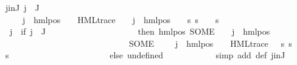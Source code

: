 \begin{isabellebody}
\ j{\isacharunderscore}{\kern0pt}in{\isacharunderscore}{\kern0pt}J{\isacharcolon}{\kern0pt}\ {\isachardoublequoteopen}j\ {\isasymin}\ J{\isachardoublequoteclose}\isanewline
\ \ \ \ \ \ \ \ \isamarkupfalse%
\ \isamarkupfalse%
\ {\isachardoublequoteopen}{\isasymexists}{\isasymalpha}\ {\isasympsi}\ {\isasymphi}{\isachardot}{\kern0pt}\ {\isasymPsi}\ j\ {\isacharequal}{\kern0pt}\ hml{\isacharunderscore}{\kern0pt}pos\ {\isasymalpha}\ {\isasympsi}\ {\isasymand}\ HML{\isacharunderscore}{\kern0pt}trace\ {\isasympsi}\ {\isasymand}\ {\isasymPhi}\ j\ {\isacharequal}{\kern0pt}\ hml{\isacharunderscore}{\kern0pt}pos\ {\isasymalpha}\ {\isasymphi}\ {\isasymand}\ {\isacharparenleft}{\kern0pt}{\isasymforall}s{\isachardot}{\kern0pt}\ {\isacharparenleft}{\kern0pt}s\ {\isasymTurnstile}\ {\isasymphi}{\isacharparenright}{\kern0pt}\ {\isacharequal}{\kern0pt}\ {\isacharparenleft}{\kern0pt}s\ {\isasymTurnstile}\ {\isasympsi}{\isacharparenright}{\kern0pt}{\isacharparenright}{\kern0pt}{\isachardoublequoteclose}\isanewline
\ \ \ \ \ \ \ \ \isamarkupfalse%
{\isacharminus}{\kern0pt}\isanewline
\ \ \ \ \ \ \ \ \isamarkupfalse%
\ {\isachardoublequoteopen}{\isasymPsi}\ j\ {\isacharequal}{\kern0pt}\ {\isacharparenleft}{\kern0pt}if\ j\ {\isasymin}\ J\ \isanewline
\ \ \ \ \ \ \ \ \ \ \ \ \ \ \ \ \ \ \ \ then\ {\isacharparenleft}{\kern0pt}hml{\isacharunderscore}{\kern0pt}pos\ {\isacharparenleft}{\kern0pt}SOME\ {\isasymalpha}{\isachardot}{\kern0pt}\ {\isasymexists}{\isasymphi}{\isachardot}{\kern0pt}\ {\isasymPhi}\ j\ {\isacharequal}{\kern0pt}\ hml{\isacharunderscore}{\kern0pt}pos\ {\isasymalpha}\ {\isasymphi}{\isacharparenright}{\kern0pt}\ \isanewline
\ \ \ \ \ \ \ \ \ \ \ \ \ \ \ \ \ \ \ \ \ \ \ \ \ \ \ \ \ \ {\isacharparenleft}{\kern0pt}SOME\ {\isasympsi}{\isachardot}{\kern0pt}\ {\isasymexists}{\isasymalpha}\ {\isasymphi}{\isachardot}{\kern0pt}\ {\isasymPhi}\ j\ {\isacharequal}{\kern0pt}\ hml{\isacharunderscore}{\kern0pt}pos\ {\isasymalpha}\ {\isasymphi}\ {\isasymand}\ HML{\isacharunderscore}{\kern0pt}trace\ {\isasympsi}\ {\isasymand}\ {\isacharparenleft}{\kern0pt}{\isasymforall}s{\isachardot}{\kern0pt}\ s\ {\isasymTurnstile}\ {\isasymphi}\ {\isasymlongleftrightarrow}\ s\ {\isasymTurnstile}\ {\isasympsi}{\isacharparenright}{\kern0pt}{\isacharparenright}{\kern0pt}{\isacharparenright}{\kern0pt}\ \isanewline
\ \ \ \ \ \ \ \ \ \ \ \ \ \ \ \ \ \ \ \ else\ undefined{\isacharparenright}{\kern0pt}{\isachardoublequoteclose}\isanewline
\ \ \ \ \ \ \ \ \ \ \isamarkupfalse%
\ {\isacharparenleft}{\kern0pt}simp\ add{\isacharcolon}{\kern0pt}\ {\isasymPsi}{\isacharunderscore}{\kern0pt}def\ j{\isacharunderscore}{\kern0pt}in{\isacharunderscore}{\kern0pt}J{\isacharparenright}{\kern0pt}\isanewline

\end{isabellebody}
